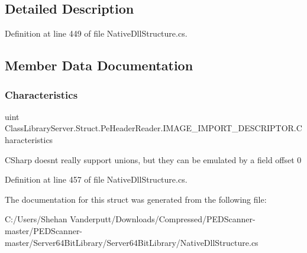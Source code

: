 \subsection{Detailed Description}


Definition at line 449 of file Native\+Dll\+Structure.\+cs.



\subsection{Member Data Documentation}
\mbox{\label{struct_class_library_server_1_1_struct_1_1_pe_header_reader_1_1_i_m_a_g_e___i_m_p_o_r_t___d_e_s_c_r_i_p_t_o_r_a8f479da148b0273c0d57c967287e309a}} 
\subsubsection{\texorpdfstring{Characteristics}{Characteristics}}
{\footnotesize\ttfamily uint Class\+Library\+Server.\+Struct.\+Pe\+Header\+Reader.\+I\+M\+A\+G\+E\+\_\+\+I\+M\+P\+O\+R\+T\+\_\+\+D\+E\+S\+C\+R\+I\+P\+T\+O\+R.\+Characteristics}



C\+Sharp doesnt really support unions, but they can be emulated by a field offset 0 



Definition at line 457 of file Native\+Dll\+Structure.\+cs.



The documentation for this struct was generated from the following file\+:\begin{DoxyCompactItemize}
\item 
C\+:/\+Users/\+Shehan Vanderputt/\+Downloads/\+Compressed/\+P\+E\+D\+Scanner-\/master/\+P\+E\+D\+Scanner-\/master/\+Server64\+Bit\+Library/\+Server64\+Bit\+Library/Native\+Dll\+Structure.\+cs\end{DoxyCompactItemize}
